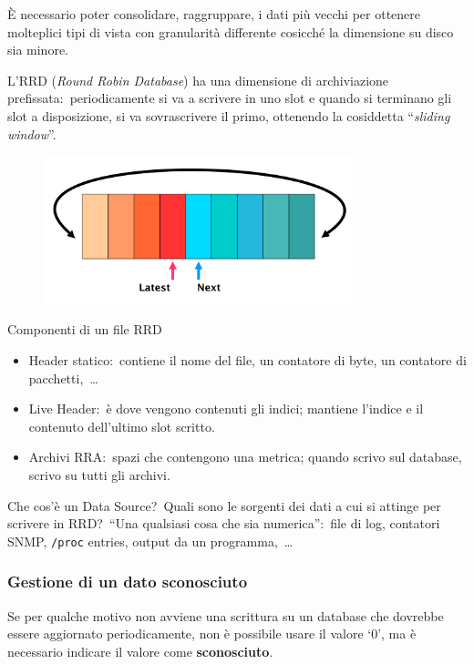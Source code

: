 È necessario poter consolidare, raggruppare, i dati più vecchi per ottenere molteplici tipi di vista con granularità differente cosicché la dimensione su disco sia minore.\

\vspace{12pt}
\noindent L'RRD (\textit{Round Robin Database}) ha una dimensione di archiviazione prefissata:\ periodicamente si va a scrivere in uno slot e quando si terminano gli slot a disposizione, si va sovrascrivere il primo, ottenendo la cosiddetta ``\textit{sliding window}''.\

\begin{figure}[H]
    \centering
    \includegraphics[width=0.8\textwidth]{immagini/RRD.png}
\end{figure}

\noindent Componenti di un file RRD

\begin{itemize}
    \item Header statico:\ contiene il nome del file, un contatore di byte, un contatore di pacchetti,\ \dots
    \item Live Header:\ è dove vengono contenuti gli indici; mantiene l'indice e il contenuto dell'ultimo slot scritto.
    \item Archivi RRA:\ spazi che contengono una metrica; quando scrivo sul database, scrivo su tutti gli archivi.
\end{itemize}

\noindent Che cos'è un Data Source?\ Quali sono le sorgenti dei dati a cui si attinge per scrivere in RRD?\
``Una qualsiasi cosa che sia numerica'':\ file di log, contatori SNMP, \verb|/proc| entries, output da un programma,\ \dots

\subsubsection{Gestione di un dato sconosciuto}

Se per qualche motivo non avviene una scrittura su un database che dovrebbe essere aggiornato periodicamente, non è possibile usare il valore `0', ma è necessario indicare il valore come \textbf{sconosciuto}.\

